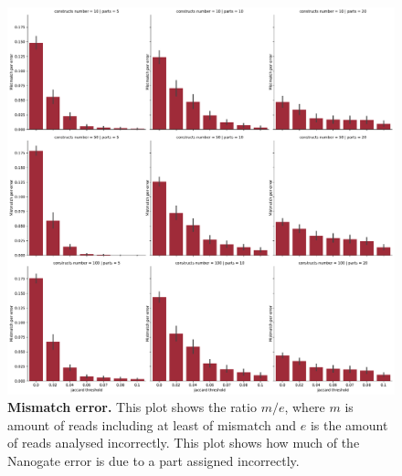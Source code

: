 \documentclass[11pt, a4paper]{article}
\begin{document}
 \begin{figure}[ht]
    \begin{center}
    \includegraphics[width=1.35\textwidth]{../results/images_notebook/v_450/sim_00_mismatch_per_error.pdf}
    \end{center}
    \caption{{\bf Mismatch error.}  This plot shows the ratio $m/e$, where $m$ is amount of reads including at least of mismatch and $e$ is the amount of reads analysed incorrectly. This plot shows how much of the Nanogate error is due to a part assigned incorrectly.}
   \label{fig:v_450_mismatch_error }
\end{figure}
\end{document}
